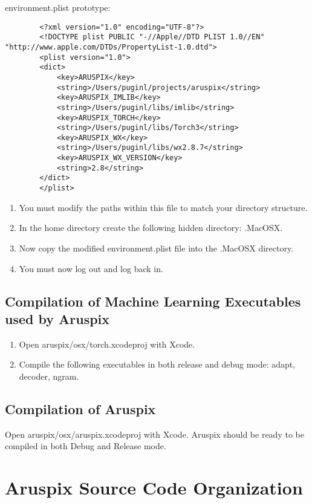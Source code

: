 \documentclass[]{article}
\begin{document}
	environment.plist prototype:
	\begin{verbatim}
		<?xml version="1.0" encoding="UTF-8"?>
		<!DOCTYPE plist PUBLIC "-//Apple//DTD PLIST 1.0//EN" "http://www.apple.com/DTDs/PropertyList-1.0.dtd">
		<plist version="1.0">
		<dict>
		    <key>ARUSPIX</key>
		    <string>/Users/puginl/projects/aruspix</string>
		    <key>ARUSPIX_IMLIB</key>
		    <string>/Users/puginl/libs/imlib</string>
		    <key>ARUSPIX_TORCH</key>
		    <string>/Users/puginl/libs/Torch3</string>
		    <key>ARUSPIX_WX</key>
		    <string>/Users/puginl/libs/wx2.8.7</string>
		    <key>ARUSPIX_WX_VERSION</key>
		    <string>2.8</string>
		</dict>
		</plist>
	\end{verbatim}
	\begin{enumerate}
		\item You must modify the paths within this file to match your directory structure.
		\item In the home directory create the following hidden directory: .MacOSX.
		\item Now copy the modified environment.plist file into the .MacOSX directory.
		\item You must now log out and log back in.
	\end{enumerate}
	
\subsection{Compilation of Machine Learning Executables used by Aruspix}
	\begin{enumerate}
		\item Open aruspix/osx/torch.xcodeproj with Xcode.
		\item Compile the following executables in both release and debug mode: adapt, decoder, ngram.
	\end{enumerate}

\subsection{Compilation of Aruspix}
Open aruspix/osx/aruspix.xcodeproj with Xcode.
Aruspix should be ready to be compiled in both Debug and Release mode. 

\section{Aruspix Source Code Organization}
\end{document}
